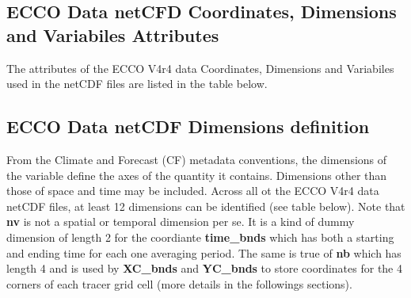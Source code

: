 \subsection{ECCO Data netCFD Coordinates, Dimensions and Variabiles Attributes}
\par The attributes of the ECCO V4r4 data Coordinates, Dimensions and Variabiles used in the netCDF files are listed in the table below.







\subsection{ECCO Data netCDF Dimensions definition}
From the Climate and Forecast (CF) metadata conventions, the dimensions of the variable define the axes of the quantity it contains. Dimensions other than those of space and time may be included. Across all ot the ECCO V4r4 data netCDF files, at least 12 dimensions can be identified (see table below). Note that \textbf{nv} is not a spatial or temporal dimension per se. It is a kind of dummy dimension of length 2 for the coordiante \textbf{time\_bnds} which has both a starting and ending time for each one averaging period. The same is true of \textbf{nb} which has length 4 and is used by \textbf{XC\_bnds} and \textbf{YC\_bnds} to store coordinates for the 4 corners of each tracer grid cell (more details in the followings sections).

